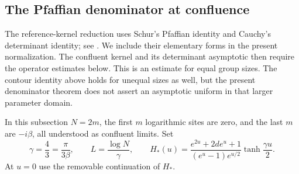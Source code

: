 \subsection{The Pfaffian denominator at confluence}

The reference-kernel reduction uses Schur's Pfaffian identity and
Cauchy's determinant identity; see
\cite[equations (1.1)--(1.2)]{IshikawaOkadaTagawaZeng2006}.
We include their elementary forms in the present normalization.
The confluent kernel and its determinant asymptotic then require
the operator estimates below. This is an estimate for equal group
sizes. The contour identity above holds for unequal sizes as well,
but the present denominator theorem does not assert an asymptotic
uniform in that larger parameter domain.

In this subsection $N=2m$, the first $m$ logarithmic sites are zero,
and the last $m$ are $-i\beta$, all understood as confluent limits.
Set
\[
 \gamma=\frac43=\frac\pi{3\beta},\qquad
 L=\frac{\log N}{\gamma},\qquad
 H_*(u)=\frac{e^{2u}+2de^u+1}{(e^u-1)e^{u/2}}
                       \tanh\frac{\gamma u}{2}.
\]
At $u=0$ use the removable continuation of $H_*$.

